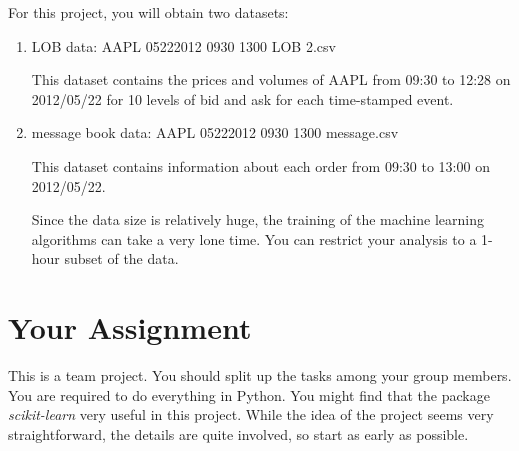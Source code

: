 \documentclass[11pt, oneside]{article}   	%
\begin{document}
For this project, you will obtain two datasets: 
\begin{enumerate}
\item LOB data: AAPL 05222012 0930 1300 LOB 2.csv

This dataset contains the prices and volumes of AAPL from 09:30 to 12:28 on 2012/05/22 for 10 levels of bid and ask for each time-stamped event.

\item message book data: AAPL 05222012 0930 1300 message.csv

This dataset contains information about each order from 09:30 to 13:00 on 2012/05/22.

Since the data size is relatively huge, the training of the machine learning algorithms can take a very lone time. You can restrict your analysis to a 1-hour subset of the data.

\end{enumerate}

\section{Your Assignment}

This is a team project. You should split up the tasks among your group members. You are required to do everything in Python. You might find that the package \textit{scikit-learn} very useful in this project. While the idea of the project seems very straightforward, the details are quite involved, so start as early as possible.
\end{document}
